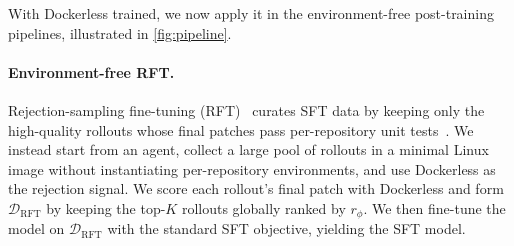 \documentclass[]{arxiv_template}
\newcommand{\approach}{Dockerless\xspace}
\newcommand{\zeng}[1]{\textcolor[rgb]{1,0.66,0}{\textbf{[Zeng: #1]}}}
\begin{document}
With \approach trained, we now apply it in the environment-free post-training pipelines, illustrated in \cref{fig:pipeline}.

\paragraph{Environment-free RFT.}
Rejection-sampling fine-tuning (RFT)~\citep{yuan2023scaling} curates SFT data by keeping only the high-quality rollouts whose final patches pass per-repository unit tests~\citep{pan2025training,jain2025r2e}.
We instead start from an agent, collect a large pool of rollouts in a minimal Linux image without instantiating per-repository environments, and use \approach as the rejection signal.
We score each rollout's final patch with \approach and form $\mathcal{D}_{\text{RFT}}$ by keeping the top-$K$ rollouts globally ranked by $r_\phi$.
We then fine-tune the model on $\mathcal{D}_{\text{RFT}}$ with the standard SFT objective, yielding the SFT model.

\end{document}
